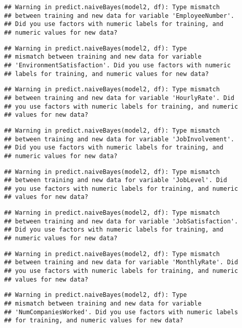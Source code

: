 \documentclass[
]{article}
\begin{document}
\begin{verbatim}
## Warning in predict.naiveBayes(model2, df): Type mismatch
## between training and new data for variable 'EmployeeNumber'.
## Did you use factors with numeric labels for training, and
## numeric values for new data?
\end{verbatim}

\begin{verbatim}
## Warning in predict.naiveBayes(model2, df): Type
## mismatch between training and new data for variable
## 'EnvironmentSatisfaction'. Did you use factors with numeric
## labels for training, and numeric values for new data?
\end{verbatim}

\begin{verbatim}
## Warning in predict.naiveBayes(model2, df): Type mismatch
## between training and new data for variable 'HourlyRate'. Did
## you use factors with numeric labels for training, and numeric
## values for new data?
\end{verbatim}

\begin{verbatim}
## Warning in predict.naiveBayes(model2, df): Type mismatch
## between training and new data for variable 'JobInvolvement'.
## Did you use factors with numeric labels for training, and
## numeric values for new data?
\end{verbatim}

\begin{verbatim}
## Warning in predict.naiveBayes(model2, df): Type mismatch
## between training and new data for variable 'JobLevel'. Did
## you use factors with numeric labels for training, and numeric
## values for new data?
\end{verbatim}

\begin{verbatim}
## Warning in predict.naiveBayes(model2, df): Type mismatch
## between training and new data for variable 'JobSatisfaction'.
## Did you use factors with numeric labels for training, and
## numeric values for new data?
\end{verbatim}

\begin{verbatim}
## Warning in predict.naiveBayes(model2, df): Type mismatch
## between training and new data for variable 'MonthlyRate'. Did
## you use factors with numeric labels for training, and numeric
## values for new data?
\end{verbatim}

\begin{verbatim}
## Warning in predict.naiveBayes(model2, df): Type
## mismatch between training and new data for variable
## 'NumCompaniesWorked'. Did you use factors with numeric labels
## for training, and numeric values for new data?
\end{verbatim}
\end{document}
